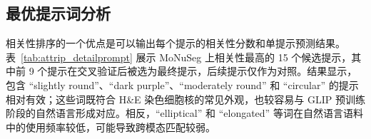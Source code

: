 \begin{table}[t]
\caption{AttriPrompter 伪标签与不同比例真实标签在 SKD 框架中的比较。最优和次优结果分别以粗体和下划线表示。}
\label{tab:attrip_semisupervised}
\begin{center}
\end{center}
\vskip -0.15in
\end{table}

\subsection{最优提示词分析}

相关性排序的一个优点是可以输出每个提示的相关性分数和单提示预测结果。表~\ref{tab:attrip_detailprompt} 展示 MoNuSeg 上相关性最高的 15 个候选提示，其中前 9 个提示在交叉验证后被选为最终提示，后续提示仅作为对照。结果显示，包含 ``slightly round''、``dark purple''、``moderately round'' 和 ``circular'' 的提示相对有效；这些词既符合 H\&E 染色细胞核的常见外观，也较容易与 GLIP 预训练阶段的自然语言形成对应。相反，``elliptical'' 和 ``elongated'' 等词在自然语言语料中的使用频率较低，可能导致跨模态匹配较弱。

